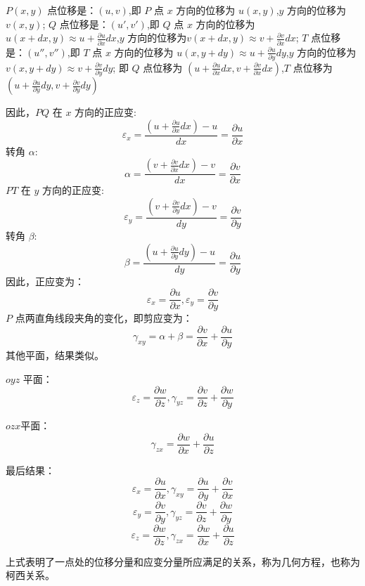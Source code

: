 \documentclass[12pt,a4paper]{article}
\begin{document}
$P(x,y)$ 点位移是：$(u,v)$,即 $P$ 点 $x$ 方向的位移为 $u(x,y)$,$y$ 方向的位移为$v(x,y)$;
$Q$ 点位移是：$(u',v')$,即 $Q$ 点 $x$ 方向的位移为 $u(x+dx,y)\approx u+\frac{\partial u}{\partial x}dx$,$y$ 方向的位移为$v(x+dx,y)\approx v+\frac{\partial v}{\partial x}dx$;
$T$ 点位移是：$(u'',v'')$,即 $T$ 点 $x$ 方向的位移为 $u(x,y+dy)\approx u+\frac{\partial u}{\partial y}dy$,$y$ 方向的位移为 $v(x,y+dy)\approx v+\frac{\partial v}{\partial y}dy$;
即 $Q$ 点位移为 $(u+\frac{\partial u}{\partial x}dx,v+\frac{\partial v}{\partial x}dx)$,$T$ 点位移为 $(u+\frac{\partial u}{\partial y}dy,v+\frac{\partial v}{\partial y}dy)$

因此，$PQ$ 在 $x$ 方向的正应变:
$$
\varepsilon_x=\frac{(u+\frac{\partial u}{\partial x}dx)-u}{dx}=\frac{\partial u}{\partial x}
$$
转角 $\alpha$:
$$
\alpha=\frac{(v+\frac{\partial v}{\partial x}dx)-v}{dx}=\frac{\partial v}{\partial x}
$$
$PT$ 在 $y$ 方向的正应变:
$$
\varepsilon_y=\frac{(v+\frac{\partial v}{\partial y}dx)-v}{dy}=\frac{\partial v}{\partial y}
$$
转角 $\beta$:
$$
\beta=\frac{(u+\frac{\partial u}{\partial y}dy)-u}{dy}=\frac{\partial u}{\partial y}
$$
因此，正应变为：
$$
\varepsilon_x=\frac{\partial u}{\partial x},\varepsilon_y=\frac{\partial v}{\partial y}
$$
$P$ 点两直角线段夹角的变化，即剪应变为：
$$
\gamma_{xy}=\alpha +\beta =\frac{\partial v}{\partial x}+\frac{\partial u}{\partial y}
$$
其他平面，结果类似。

$oyz$ 平面：
$$
\varepsilon_z=\frac{\partial w}{\partial z},\gamma_{yz}=\frac{\partial v}{\partial z}+\frac{\partial w}{\partial y}
$$

$ozx$平面：
$$
\gamma_{zx}=\frac{\partial w}{\partial x}+\frac{\partial u}{\partial z}
$$

最后结果：
$$
\varepsilon_x=\frac{\partial u}{\partial x},\gamma_{xy}=\frac{\partial u}{\partial y}+\frac{\partial v}{\partial x}
$$
$$
\varepsilon_y=\frac{\partial v}{\partial y},\gamma_{yz}=\frac{\partial v}{\partial z}+\frac{\partial w}{\partial y}
$$
$$
\varepsilon_z=\frac{\partial w}{\partial z},\gamma_{zx}=\frac{\partial w}{\partial x}+\frac{\partial u}{\partial z}
$$

上式表明了一点处的位移分量和应变分量所应满足的关系，称为几何方程，也称为柯西关系。
\end{document}
